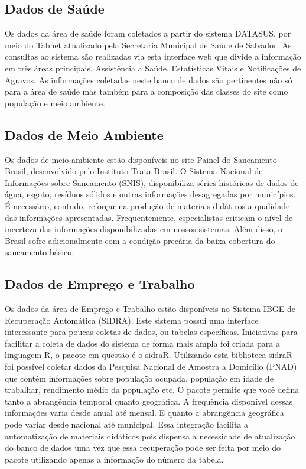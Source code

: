 \documentclass[
]{book}
\begin{document}
\hypertarget{dados-de-sauxfade}{%
\subsection{Dados de Saúde}\label{dados-de-sauxfade}}

Os dados da área de saúde foram coletados a partir do sistema DATASUS, por meio do Tabnet atualizado pela Secretaria Municipal de Saúde de Salvador. As consultas ao sistema são realizadas via esta interface web que divide a informação em três áreas principais, Assistência a Saúde, Estatísticas Vitais e Notificações de Agravos. As informações coletadas neste banco de dados são pertinentes não só para a área de saúde mas também para a composição das classes do site como população e meio ambiente.

\hypertarget{dados-de-meio-ambiente}{%
\subsection{Dados de Meio Ambiente}\label{dados-de-meio-ambiente}}

Os dados de meio ambiente estão disponíveis no site Painel do Saneamento Brasil, desenvolvido pelo Instituto Trata Brasil. O Sistema Nacional de Informações sobre Saneamento (SNIS), disponibiliza séries históricas de dados de água, esgoto, resíduos sólidos e outras informações desagregadas por municípios. É necessário, contudo, reforçar na produção de materiais didáticos a qualidade das informações apresentadas. Frequentemente, especialistas criticam o nível de incerteza das informações disponibilizadas em nossos sistemas. Além disso, o Brasil sofre adicionalmente com a condição precária da baixa cobertura do saneamento básico.

\hypertarget{dados-de-emprego-e-trabalho}{%
\subsection{Dados de Emprego e Trabalho}\label{dados-de-emprego-e-trabalho}}

Os dados da área de Emprego e Trabalho estão disponíveis no Sistema IBGE de Recuperação Automática (SIDRA). Este sistema possui uma interface interessante para poucas coletas de dados, ou tabelas específicas. Iniciativas para facilitar a coleta de dados do sistema de forma mais ampla foi criada para a linguagem R, o pacote em questão é o sidraR. Utilizando esta biblioteca sidraR foi possível coletar dados da Pesquisa Nacional de Amostra a Domicílio (PNAD) que contém informações sobre população ocupada, população em idade de trabalhar, rendimento médio da população etc. O pacote permite que você defina tanto a abrangência temporal quanto geográfica. A frequência disponível dessas informações varia desde anual até mensal. E quanto a abrangência geográfica pode variar desde nacional até municipal. Essa integração facilita a automatização de materiais didáticos pois dispensa a necessidade de atualização do banco de dados uma vez que essa recuperação pode ser feita por meio do pacote utilizando apenas a informação do número da tabela.
\end{document}
